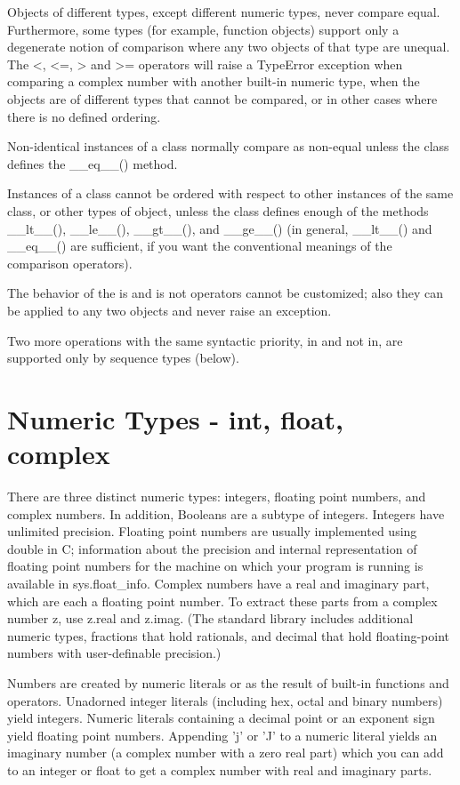 Objects of different types, except different numeric types, never compare equal. Furthermore, some types (for example, function objects) support only a degenerate notion of comparison where any two objects of that type are unequal. The <, <=, > and >= operators will raise a TypeError exception when comparing a complex number with another built-in numeric type, when the objects are of different types that cannot be compared, or in other cases where there is no defined ordering.

Non-identical instances of a class normally compare as non-equal unless the class defines the \_\_eq\_\_() method.

Instances of a class cannot be ordered with respect to other instances of the same class, or other types of object, unless the class defines enough of the methods \_\_lt\_\_(), \_\_le\_\_(), \_\_gt\_\_(), and \_\_ge\_\_() (in general, \_\_lt\_\_() and \_\_eq\_\_() are sufficient, if you want the conventional meanings of the comparison operators).

The behavior of the is and is not operators cannot be customized; also they can be applied to any two objects and never raise an exception.

Two more operations with the same syntactic priority, in and not in, are supported only by sequence types (below).


\section{Numeric Types - int, float, complex}

There are three distinct numeric types: integers, floating point numbers, and complex numbers. In addition, Booleans are a subtype of integers. Integers have unlimited precision. Floating point numbers are usually implemented using double in C; information about the precision and internal representation of floating point numbers for the machine on which your program is running is available in sys.float\_info. Complex numbers have a real and imaginary part, which are each a floating point number. To extract these parts from a complex number z, use z.real and z.imag. (The standard library includes additional numeric types, fractions that hold rationals, and decimal that hold floating-point numbers with user-definable precision.)

\vpara
Numbers are created by numeric literals or as the result of built-in functions and operators. Unadorned integer literals (including hex, octal and binary numbers) yield integers. Numeric literals containing a decimal point or an exponent sign yield floating point numbers. Appending 'j' or 'J' to a numeric literal yields an imaginary number (a complex number with a zero real part) which you can add to an integer or float to get a complex number with real and imaginary parts.


